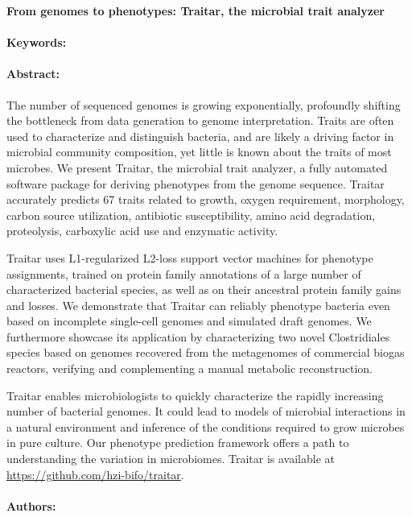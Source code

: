 \noindent
\large {\bf From genomes to phenotypes: Traitar, the microbial trait analyzer} 


\normalsize 


\noindent \paragraph{Keywords:} 

\noindent \paragraph{Abstract:} 


The number of sequenced genomes is growing exponentially, profoundly shifting the
bottleneck from data generation to genome interpretation. Traits are often used to
characterize and distinguish bacteria, and are likely a driving factor in microbial community
composition, yet little is known about the traits of most microbes. We present Traitar, the
microbial trait analyzer, a fully automated software package for deriving phenotypes from the
genome sequence. Traitar accurately predicts 67 traits related to growth, oxygen
requirement, morphology, carbon source utilization, antibiotic susceptibility, amino acid
degradation, proteolysis, carboxylic acid use and enzymatic activity.

Traitar uses L1-regularized L2-loss support vector machines for phenotype assignments,
trained on protein family annotations of a large number of characterized bacterial species, as
well as on their ancestral protein family gains and losses. We demonstrate that Traitar can
reliably phenotype bacteria even based on incomplete single-cell genomes and simulated
draft genomes. We furthermore showcase its application by characterizing two novel
Clostridiales species based on genomes recovered from the metagenomes of commercial
biogas reactors, verifying and complementing a manual metabolic reconstruction.

Traitar enables microbiologists to quickly characterize the rapidly increasing number of
bacterial genomes. It could lead to models of microbial interactions in a natural environment
and inference of the conditions required to grow microbes in pure culture. Our phenotype
prediction framework offers a path to understanding the variation in microbiomes. Traitar is
available at \url{https://github.com/hzi-bifo/traitar}.

\noindent \paragraph{Authors:} 

